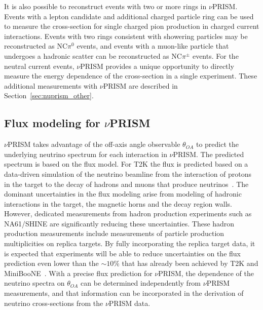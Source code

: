 It is also possible to reconstruct events with two or more rings in $\nu$PRISM.  Events with a lepton candidate and additional 
charged particle ring can be used to measure the cross-section for single charged pion production in charged current interactions.
Events with two rings consistent with showering particles may be reconstructed as NC$\pi^{0}$ events, and events with a muon-like
particle that undergoes a hadronic scatter can be reconstructed as NC$\pi^{\pm}$ events.   For the neutral current events,
$\nu$PRISM provides a unique opportunity to directly measure the energy dependence of the cross-section in a single experiment.
These additional measurements with $\nu$PRISM are described in Section~\ref{sec:nuprism_other}.

\subsection{Flux modeling for $\nu$PRISM}
$\nu$PRISM takes advantage of the off-axis angle observable $\theta_{OA}$ to predict the underlying neutrino spectrum
for each interaction in $\nu$PRISM.  The predicted spectrum is based on the flux model.  For T2K the flux is predicted
based on a data-driven simulation of the neutrino beamline from the interaction of protons in the target to the decay of
hadrons and muons that produce neutrinos~\cite{Abe:2012av}.  The dominant uncertainties in the flux modeling arise from
modeling of hadronic interactions in the target, the magnetic horns and the decay region walls.  However, dedicated 
measurements from hadron production experiments such as NA61/SHINE are significantly reducing these uncertainties.  
These hadron production measurements include measurements of particle production multiplicities on replica targets.
By fully incorporating the replica target data, it is expected that experiments will be able to reduce uncertainties on the
flux prediction even lower than the $\sim10\%$ that has already been achieved by T2K and MiniBooNE~\cite{AguilarArevalo:2008yp}.  
With a precise 
flux prediction for $\nu$PRISM, the dependence of the neutrino spectra on $\theta_{OA}$ can be determined independently 
from $\nu$PRISM measurements, and that information can be incorporated in the derivation of neutrino cross-sections from the
$\nu$PRISM data. 

